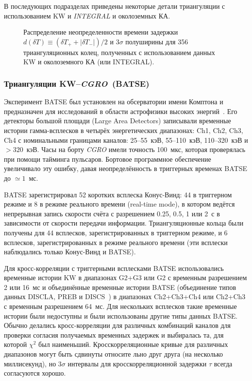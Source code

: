В последующих подразделах приведены некоторые детали триангуляции с использованием 
KW и \textit{INTEGRAL} и околоземных КА.

\begin{figure}[h]
    \caption[Распределение ширин колец, построенных с использованием околоземных КА]
    {Распределение неопределенности времени задержки $d(\delta T) \equiv (\delta T_{+} + |\delta T_{-}|)/2$
    и $3\sigma$ полуширины для 356 триангуляционных колец, полученных с использованием данных
    KW и околоземного КА (или INTEGRAL).}
 \label{img:dist_356}  
\end{figure}
\FloatBarrier
\subsubsection{Триангуляции KW--\textit{CGRO}~(BATSE)}\label{sec:KW_BATSE_cc}
Эксперимент BATSE был установлен на обсерватории имени Комптона и предназначен 
для исследований в области астрофизики высоких энергий~\citep{Fishman_1992NASCP3137}. 
Его детекторы большой площади (Large Area Detectors) записывали временные истории 
гамма-всплесков в четырёх энергетических диапазонах: Ch1, Ch2, Ch3, Ch4 с номинальными 
границами каналов: 25--55~кэВ, 55--110~кэВ, 110--320~кэВ и $>320$~кэВ. 
Часы на борту \textit{CGRO} имели точность 100~мкс, которая проверялась при помощи 
тайминга пульсаров. Бортовое программное обеспечение увеличивало эту ошибку, 
давая неопределённость в триггерных временах BATSE до $\simeq 1$~мс.

BATSE зарегистрировал 52 коротких всплеска Конус-Винд: 44 в триггерном режиме 
и 8 в режиме реального времени (real-time mode), в котором ведётся непрерывная 
запись скорости счёта с разрешением 0.25, 0.5, 1 или 2~с в зависимости от скорости 
передачи информации. Триангуляционные кольца были получены для 44 всплесков, 
зарегистрированных в триггерном режиме, и 6 всплесков, зарегистрированных в 
режиме реального времени (эти всплески наблюдались только Конус-Винд и BATSE).

Для кросс-корреляции с триггерными всплесками BATSE использовались временные 
истории KW в диапазонах G2+G3 или G2 с временным разрешением 2 или 16~мс 
и объединённые временные истории BATSE (объединение типов данных DISCLA, PREB 
и DISCS~\citep{Fishman_1992NASCP3137}) в диапазонах Ch2+Ch3+Ch4 или Ch2+Ch3 
с временным разрешением 64~мс. Для нескольких всплесков такие временные истории 
были недоступны и были использованы другие типы данных BATSE. Обычно делались 
кросс-корреляции для различных комбинаций каналов для проверки согласия 
получаемых временных задержек и выбиралась та, для которой $\chi^2$ был наименьший. 
Кросскорреляционные кривые для различных диапазонов могут быть сдвинуты относите
льно друг друга (на несколько миллисекунд), но $3\sigma$ интервалы для 
кросскорреляционной задержки $\tau$ всегда согласуются хорошо.

